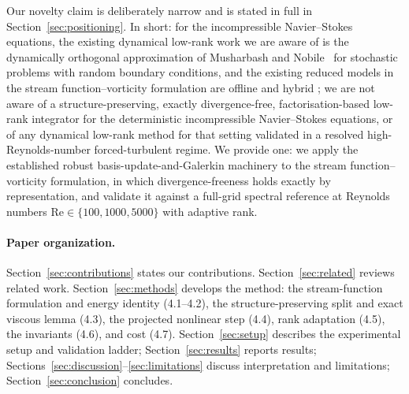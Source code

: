 Our novelty claim is deliberately narrow and is stated in full in
Section~\ref{sec:positioning}.  In short: for the incompressible
Navier--Stokes equations, the existing dynamical low-rank work we are aware
of is the dynamically orthogonal approximation of Musharbash and
Nobile~\cite{musharbash2018} for stochastic problems with random boundary
conditions, and the existing reduced models in the stream
function--vorticity formulation are offline and hybrid
\cite{girfoglio2022pod,zhang2024}; we are not aware of a structure-preserving,
exactly divergence-free, factorisation-based low-rank integrator for the
deterministic incompressible Navier--Stokes equations, or of any dynamical
low-rank method for that setting validated in a resolved
high-Reynolds-number forced-turbulent regime.  We provide one: we apply the
established robust basis-update-and-Galerkin machinery to the stream
function--vorticity formulation, in which divergence-freeness holds exactly
by representation, and validate it against a full-grid spectral reference at
Reynolds numbers $\mathrm{Re} \in \{100, 1000, 5000\}$ with adaptive rank.

\paragraph{Paper organization.}
Section~\ref{sec:contributions} states our contributions.
Section~\ref{sec:related} reviews related work. Section~\ref{sec:methods}
develops the method: the stream-function formulation and energy identity
(4.1--4.2), the structure-preserving split and exact viscous lemma
(4.3), the projected nonlinear step (4.4), rank adaptation (4.5), the
invariants (4.6), and cost (4.7). Section~\ref{sec:setup} describes the
experimental setup and validation ladder; Section~\ref{sec:results} reports
results; Sections~\ref{sec:discussion}--\ref{sec:limitations} discuss
interpretation and limitations; Section~\ref{sec:conclusion} concludes.
